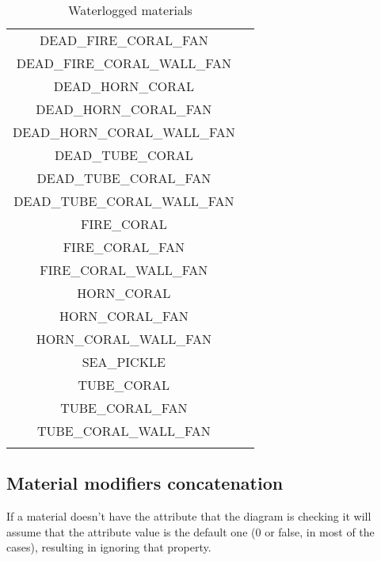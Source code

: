 \begin{longtable}{ |c|c| }
	DEAD\_FIRE\_CORAL\_FAN & \cmark \\
	DEAD\_FIRE\_CORAL\_WALL\_FAN & \cmark \\
	DEAD\_HORN\_CORAL & \cmark \\
	DEAD\_HORN\_CORAL\_FAN & \cmark \\
	DEAD\_HORN\_CORAL\_WALL\_FAN & \cmark \\
	DEAD\_TUBE\_CORAL & \cmark \\
	DEAD\_TUBE\_CORAL\_FAN & \cmark \\
	DEAD\_TUBE\_CORAL\_WALL\_FAN & \cmark \\
	FIRE\_CORAL & \cmark \\
	FIRE\_CORAL\_FAN & \cmark \\
	FIRE\_CORAL\_WALL\_FAN & \cmark \\
	HORN\_CORAL & \cmark \\
	HORN\_CORAL\_FAN & \cmark \\
	HORN\_CORAL\_WALL\_FAN & \cmark \\
	SEA\_PICKLE & \cmark \\
	TUBE\_CORAL & \cmark \\
	TUBE\_CORAL\_FAN & \cmark \\
	TUBE\_CORAL\_WALL\_FAN & \cmark \\
	\hline
	\caption{Waterlogged materials}
\end{longtable}


\subsection{Material modifiers concatenation}

If a material doesn't have the attribute that the diagram is checking it will assume that the attribute value is the default one (0 or false, in most of the cases), resulting in ignoring that property.

